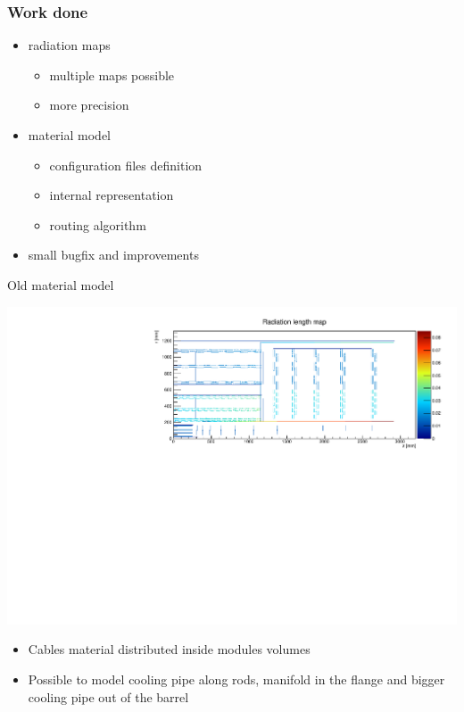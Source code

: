 \documentclass[pdftex, 11pt]{beamer}
\begin{document}
\begin{frame}
  \frametitle{Work done}
  \begin{itemize}
  \item \alert{radiation maps}
    \begin{itemize}
    \item multiple maps possible
    \item more precision
    \end{itemize}
  \item \alert{material} model
    \begin{itemize}
    \item configuration files definition
    \item internal representation
    \item routing algorithm
    \end{itemize}
  \item small bugfix and improvements
  \end{itemize}
\end{frame}

\begin{frame}{Old material model}
  \begin{center}
    \includegraphics[width=\textwidth]{img/oldModel.pdf}
  \end{center}
  \begin{itemize}
  \item Cables material distributed \alert{inside} modules volumes
  \item Possible to model \alert{cooling pipe} along rods, \alert{manifold} in the flange and bigger cooling pipe out of the barrel
  \end{itemize}
\end{frame}
\end{document}
